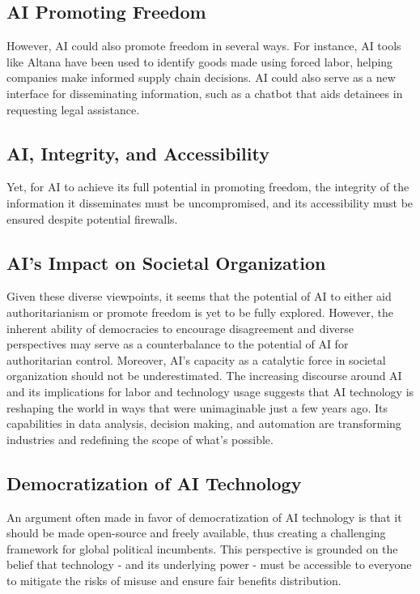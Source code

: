 \subsection{AI Promoting Freedom}
However, AI could also promote freedom in several ways. For instance, AI tools like Altana have been used to identify goods made using forced labor, helping companies make informed supply chain decisions. AI could also serve as a new interface for disseminating information, such as a chatbot that aids detainees in requesting legal assistance.

\subsection{AI, Integrity, and Accessibility}
Yet, for AI to achieve its full potential in promoting freedom, the integrity of the information it disseminates must be uncompromised, and its accessibility must be ensured despite potential firewalls.

\subsection{AI's Impact on Societal Organization}
Given these diverse viewpoints, it seems that the potential of AI to either aid authoritarianism or promote freedom is yet to be fully explored. However, the inherent ability of democracies to encourage disagreement and diverse perspectives may serve as a counterbalance to the potential of AI for authoritarian control. Moreover, AI's capacity as a catalytic force in societal organization should not be underestimated. The increasing discourse around AI and its implications for labor and technology usage suggests that AI technology is reshaping the world in ways that were unimaginable just a few years ago. Its capabilities in data analysis, decision making, and automation are transforming industries and redefining the scope of what's possible.

\subsection{Democratization of AI Technology}
An argument often made in favor of democratization of AI technology is that it should be made open-source and freely available, thus creating a challenging framework for global political incumbents. This perspective is grounded on the belief that technology - and its underlying power - must be accessible to everyone to mitigate the risks of misuse and ensure fair benefits distribution.

